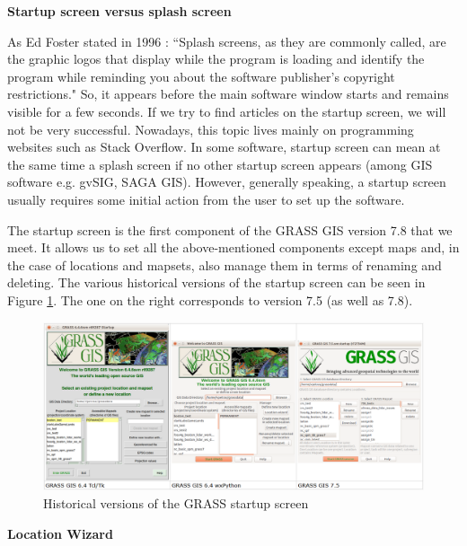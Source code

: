 \documentclass[a4paper,10pt,twoside]{article}
\begin{document}
\bigskip
\noindent \textbf {Startup screen versus splash screen}

\noindent As Ed Foster stated in 1996 \cite{foster}: ``Splash screens,
as they are commonly called, are the graphic logos that display while
the program is loading and identify the program while reminding you
about the software publisher's copyright restrictions." So, it appears
before the main software window starts and remains visible for a few
seconds. If we try to find articles on the startup screen, we will not
be very successful. Nowadays, this topic lives mainly on programming
websites such as Stack Overflow. In some software, startup screen can
mean at the same time a splash screen if no other startup screen
appears (among GIS software e.g. gvSIG, SAGA GIS). However, generally
speaking, a startup screen usually requires some initial action from
the user to set up the software.

The startup screen is the first component of the GRASS GIS version 7.8
that we meet. It allows us to set all the above-mentioned components
except maps and, in the case of locations and mapsets, also manage
them in terms of renaming and deleting. The various historical
versions of the startup screen can be seen in Figure
\ref{fig:verze_startup}. The one on the right corresponds to version
7.5 (as well as 7.8).

\vspace{0.3cm}
\begin{figure}[hbt!]
\begin{center}
\includegraphics[width=17cm]{../pictures/verze_startup.png} 
\caption[Historical versions of the GRASS startup screen]{Historical versions of the GRASS startup screen}
\label{fig:verze_startup}
\end{center}
\end{figure}

\bigskip
\noindent \textbf {Location Wizard}
\end{document}
